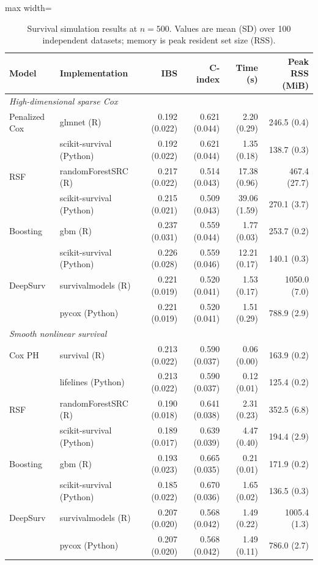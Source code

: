 \begin{table}[htbp]
\centering
\small
\caption{Survival simulation results at $n=500$. Values are mean (SD) over 100 independent datasets; memory is peak resident set size (RSS).}
\label{tab:survival_simulation_results}
\setlength{\tabcolsep}{3pt}
\renewcommand{\arraystretch}{1.1}
\begin{adjustbox}{max width=\linewidth}
\begin{tabular}{llrrrr}
\toprule
Model & Implementation & IBS & C-index & Time (s) & Peak RSS (MiB) \\
\midrule
\multicolumn{6}{l}{\textit{High-dimensional sparse Cox}}\\
Penalized Cox & glmnet (R) & 0.192 (0.022) & 0.621 (0.044) & 2.20 (0.29) & 246.5 (0.4) \\
 & scikit-survival (Python) & 0.192 (0.022) & 0.621 (0.044) & 1.35 (0.18) & 138.7 (0.3) \\
RSF & randomForestSRC (R) & 0.217 (0.022) & 0.514 (0.043) & 17.38 (0.96) & 467.4 (27.7) \\
 & scikit-survival (Python) & 0.215 (0.021) & 0.509 (0.043) & 39.06 (1.59) & 270.1 (3.7) \\
Boosting & gbm (R) & 0.237 (0.031) & 0.559 (0.044) & 1.77 (0.03) & 253.7 (0.2) \\
 & scikit-survival (Python) & 0.226 (0.028) & 0.559 (0.046) & 12.21 (0.17) & 140.1 (0.3) \\
DeepSurv & survivalmodels (R) & 0.221 (0.019) & 0.520 (0.041) & 1.53 (0.17) & 1050.0 (7.0) \\
 & pycox (Python) & 0.221 (0.019) & 0.520 (0.041) & 1.51 (0.29) & 788.9 (2.9) \\
\midrule
\multicolumn{6}{l}{\textit{Smooth nonlinear survival}}\\
Cox PH & survival (R) & 0.213 (0.022) & 0.590 (0.037) & 0.06 (0.00) & 163.9 (0.2) \\
 & lifelines (Python) & 0.213 (0.022) & 0.590 (0.037) & 0.12 (0.01) & 125.4 (0.2) \\
RSF & randomForestSRC (R) & 0.190 (0.018) & 0.641 (0.038) & 2.31 (0.23) & 352.5 (6.8) \\
 & scikit-survival (Python) & 0.189 (0.017) & 0.639 (0.039) & 4.47 (0.40) & 194.4 (2.9) \\
Boosting & gbm (R) & 0.193 (0.023) & 0.665 (0.035) & 0.21 (0.01) & 171.9 (0.2) \\
 & scikit-survival (Python) & 0.185 (0.022) & 0.670 (0.036) & 1.65 (0.02) & 136.5 (0.3) \\
DeepSurv & survivalmodels (R) & 0.207 (0.020) & 0.568 (0.042) & 1.49 (0.22) & 1005.4 (1.3) \\
 & pycox (Python) & 0.207 (0.020) & 0.568 (0.042) & 1.49 (0.11) & 786.0 (2.7) \\
\bottomrule
\end{tabular}
\end{adjustbox}
\end{table}
